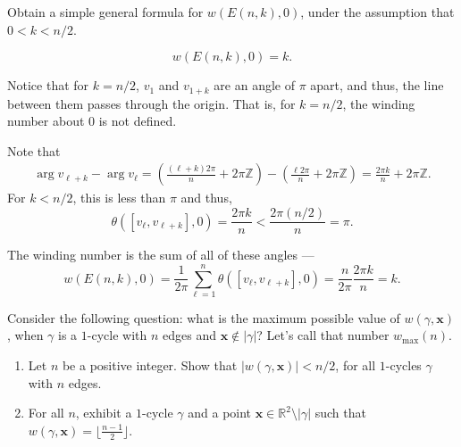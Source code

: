 \documentclass[12 pt, letterpaper]{hmcpset}
\begin{document}
\pagebreak

\begin{problem}[4.]
	Obtain a simple general formula for $w(E(n, k), 0)$, under the assumption that $0 < k < n / 2$.
\end{problem}

\begin{solution}
	\[
		\boxed{
			w(E(n, k), 0) = k.
		}
	\]

	Notice that for $k = n / 2$,  $v_{1}$ and $v_{1 + k}$ are an angle of $\pi$ apart, and thus, the line between them passes through the origin. That is, for $k = n / 2$, the winding number about $0$ is not defined.

	Note that
	\begin{align*}
		\operatorname{arg} v_{\ell + k} - \operatorname{arg} v_{\ell} = \left ( \frac{(\ell + k) 2 \pi}{n} + 2 \pi \mathbb{Z} \right ) - \left ( \frac{\ell 2 \pi}{n} + 2 \pi \mathbb{Z} \right ) = \frac{2 \pi k}{n} + 2 \pi \mathbb{Z}.
	\end{align*}
	For $k < n / 2$, this is less than $\pi$ and thus,
	\[
		\theta([v_{\ell}, v_{\ell + k}], 0) = \frac{2 \pi k}{n} < \frac{2 \pi (n / 2)}{n} = \pi.
	\]

	The winding number is the sum of all of these angles ---
	\[
		w(E(n, k), 0) = \frac{1}{2 \pi} \sum_{\ell = 1}^{n} \theta([v_{\ell}, v_{\ell + k}], 0) = \frac{n}{2 \pi} \frac{2 \pi k}{n} = k.
	\]
\end{solution}	

\pagebreak

\begin{problem}[5.]
	Consider the following question: what is the maximum possible value of $w(\gamma, \mathbf{x})$, when $\gamma$ is a $1$-cycle with $n$ edges and $\mathbf{x} \notin \lvert \gamma \rvert$? Let's call that number $w_{\text{max}}(n)$.
	\begin{enumerate}
		\item Let $n$ be a positive integer. Show that $\lvert w(\gamma, \mathbf{x}) \rvert < n / 2$, for all $1$-cycles $\gamma$ with $n$ edges.
		\item For all $n$, exhibit a $1$-cycle $\gamma$ and a point $\mathbf{x} \in \mathbb{R}^{2} \setminus \lvert \gamma \rvert$ such that $w(\gamma, \mathbf{x}) = \lfloor \frac{n - 1}{2} \rfloor$.
	\end{enumerate}
\end{problem}
\end{document}
